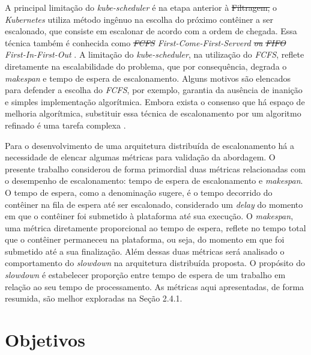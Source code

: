 \documentclass[
	12pt,				%
	openright,			%
	oneside,			%
	a4paper,			%
	brazil				%
	]{abntex2}
\providecommand{\DIFaddtex}[1]{{\protect\color{blue}\uwave{#1}}} %
\providecommand{\DIFdeltex}[1]{{\protect\color{red}\sout{#1}}}                      %
\providecommand{\DIFaddbegin}{} %
\providecommand{\DIFaddend}{} %
\providecommand{\DIFdelbegin}{} %
\providecommand{\DIFdelend}{} %
\providecommand{\DIFadd}[1]{\texorpdfstring{\DIFaddtex{#1}}{#1}} %
\providecommand{\DIFdel}[1]{\texorpdfstring{\DIFdeltex{#1}}{}} %
\newcommand{\DIFscaledelfig}{0.5}
\newlength{\DIFdelgraphicswidth} %
\newlength{\DIFdelgraphicsheight} %
\newcommand{\DIFaddincludegraphics}[2][]{{\color{blue}\fbox{\DIFOincludegraphics[#1]{#2}}}} %
\newcommand{\DIFdelincludegraphics}[2][]{%
\sbox{\DIFdelgraphicsbox}{\DIFOincludegraphics[#1]{#2}}%
\settoboxwidth{\DIFdelgraphicswidth}{\DIFdelgraphicsbox} %
\settoboxtotalheight{\DIFdelgraphicsheight}{\DIFdelgraphicsbox} %
\scalebox{\DIFscaledelfig}{%
\parbox[b]{\DIFdelgraphicswidth}{\usebox{\DIFdelgraphicsbox}\\[-\baselineskip] \rule{\DIFdelgraphicswidth}{0em}}\llap{\resizebox{\DIFdelgraphicswidth}{\DIFdelgraphicsheight}{%
\setlength{\unitlength}{\DIFdelgraphicswidth}%
\begin{picture}(1,1)%
\thicklines\linethickness{2pt} %
{\color[rgb]{1,0,0}\put(0,0){\framebox(1,1){}}}%
{\color[rgb]{1,0,0}\put(0,0){\line( 1,1){1}}}%
{\color[rgb]{1,0,0}\put(0,1){\line(1,-1){1}}}%
\end{picture}%
}\hspace*{3pt}}} %
} %
\DeclareRobustCommand{\DIFaddbegin}{\DIFOaddbegin \let\includegraphics\DIFaddincludegraphics} %
\DeclareRobustCommand{\DIFaddend}{\DIFOaddend \let\includegraphics\DIFOincludegraphics} %
\DeclareRobustCommand{\DIFdelbegin}{\DIFOdelbegin \let\includegraphics\DIFdelincludegraphics} %
\DeclareRobustCommand{\DIFdelend}{\DIFOaddend \let\includegraphics\DIFOincludegraphics} %
\begin{document}
A principal limitação do \textit{kube-scheduler} é na etapa anterior à \DIFdelbegin \DIFdel{Filtragem, }\DIFdelend \DIFaddbegin \DIFadd{filtragem: }\DIFaddend o \textit{Kubernetes} utiliza \DIFaddbegin \DIFadd{um }\DIFaddend método ingênuo na escolha do próximo contêiner a ser escalonado, que consiste em escalonar de acordo com a ordem de chegada. Essa técnica também é conhecida como \textit{\DIFdelbegin \DIFdel{FCFS }\DIFdelend First-Come-First-Serverd\DIFdelbegin %
\DIFdel{ou }\DIFdelend \DIFaddbegin } \DIFadd{(FCFS) ou }\DIFaddend \textit{\DIFdelbegin \DIFdel{FIFO }\DIFdelend First-In-First-Out} \DIFaddbegin \DIFadd{(FIFO)~}\DIFaddend \cite{Ye2007}. A limitação do \textit{kube-scheduler}, na utilização do \textit{FCFS}, reflete diretamente na escalabilidade do problema, que por consequência, degrada o \textit{makespan} \DIFaddbegin \DIFadd{(tempo total) }\DIFaddend e tempo de espera de escalonamento. Alguns motivos são elencados para defender a escolha do \textit{FCFS}, por exemplo, garantia da ausência de inanição e simples implementação algorítmica. Embora exista o consenso que há espaço de melhoria algorítmica, substituir essa técnica de escalonamento por um algoritmo refinado é uma tarefa complexa \cite{CarastanSantos2019}.

Para o desenvolvimento de uma arquitetura distribuída de escalonamento há a necessidade de elencar algumas métricas para validação da abordagem. O presente trabalho considerou de forma primordial duas métricas relacionadas com o desempenho de escalonamento: tempo de espera de escalonamento e \textit{makespan}. O tempo de espera, como a denominação sugere, é o tempo decorrido do contêiner na fila de espera até ser escalonado, considerado um \textit{delay} do momento em que o contêiner foi submetido à plataforma até sua execução. O \textit{makespan}, uma métrica diretamente proporcional ao tempo de espera, reflete no tempo total que o contêiner permaneceu na plataforma, ou seja, do momento em que foi submetido até a sua finalização. Além dessas duas métricas será analisado o comportamento do \textit{slowdown} na arquitetura distribuída proposta. O propósito do \textit{slowdown} é estabelecer proporção entre tempo de espera de um trabalho em relação ao seu tempo de processamento. As métricas aqui apresentadas, de forma resumida, são melhor exploradas na Seção 2.4.1.

\section{Objetivos}
\label{obj}
\end{document}
